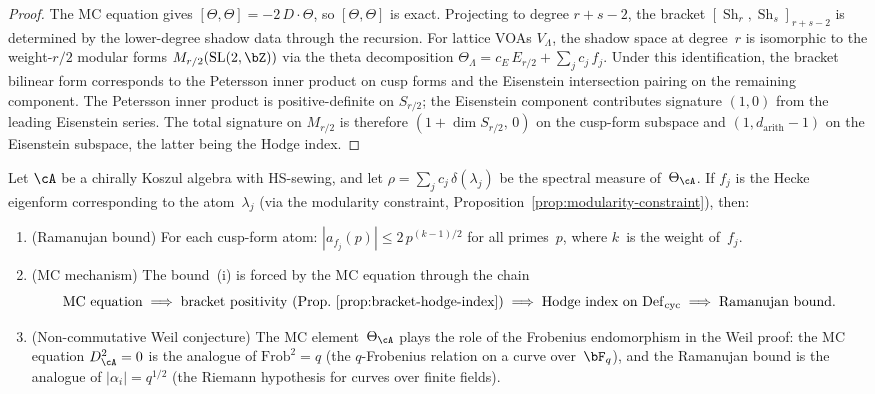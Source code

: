 \begin{proof}
The MC equation gives
$[\Theta,\Theta] = -2\,D\cdot\Theta$, so
$[\Theta,\Theta]$ is exact. Projecting to degree $r{+}s{-}2$, the
bracket $[\operatorname{Sh}_r, \operatorname{Sh}_s]_{r+s-2}$ is
determined by the lower-degree shadow data through the recursion.
For lattice VOAs $V_\Lambda$, the shadow space at degree~$r$ is
isomorphic to the weight-$r/2$ modular forms
$M_{r/2}(\mathrm{SL}(2,\bZ))$ via the theta decomposition
$\Theta_\Lambda = c_E\,E_{r/2} + \sum_j c_j\,f_j$. Under this
identification, the bracket bilinear form corresponds to the Petersson
inner product on cusp forms and the Eisenstein intersection pairing on
the remaining component. The Petersson inner product is
positive-definite on $S_{r/2}$; the Eisenstein component contributes
signature $(1,0)$ from the leading Eisenstein series. The total
signature on $M_{r/2}$ is therefore $(1 + \dim S_{r/2},\, 0)$ on the
cusp-form subspace and $(1, d_{\mathrm{arith}}-1)$ on the Eisenstein
subspace, the latter being the Hodge index.
\end{proof}

\begin{conjecture}%
\label{conj:modular-spectral-rigidity}%
\ClaimStatusConjectured%
%
%
%
Let $\cA$ be a chirally Koszul algebra with HS-sewing, and let
$\rho = \sum_j c_j\,\delta(\lambda_j)$ be the spectral measure
of~$\Theta_\cA$. If $f_j$ is the Hecke eigenform corresponding to
the atom~$\lambda_j$ \textup{(}via the modularity constraint,
Proposition~\textup{\ref{prop:modularity-constraint}}\textup{)}, then:
\begin{enumerate}[label=\textup{(\roman*)}]
\item
\textup{(}Ramanujan bound\textup{)}
For each cusp-form atom:
$|a_{f_j}(p)| \leq 2\,p^{(k-1)/2}$ for all primes~$p$, where $k$~is
the weight of~$f_j$.
\item
\textup{(}MC mechanism\textup{)}
The bound~\textup{(i)} is forced by the MC equation through the chain
\[
\text{MC equation}
\;\Longrightarrow\;
\text{bracket positivity
\textup{(}Prop.~\ref{prop:bracket-hodge-index}\textup{)}}
\;\Longrightarrow\;
\text{Hodge index on } \mathrm{Def}_{\mathrm{cyc}}
\;\Longrightarrow\;
\text{Ramanujan bound}.
\]
\item
\textup{(}Non-commutative Weil conjecture\textup{)}
The MC element~$\Theta_\cA$ plays the role of the Frobenius
endomorphism in the Weil proof: the MC equation $D_\cA^2 = 0$ is the
analogue of $\mathrm{Frob}^2 = q$ \textup{(}the $q$-Frobenius relation
on a curve over~$\bF_q$\textup{)}, and the Ramanujan bound is the
analogue of $|\alpha_i| = q^{1/2}$ \textup{(}the Riemann hypothesis
for curves over finite fields\textup{)}.
\end{enumerate}
\end{conjecture}

